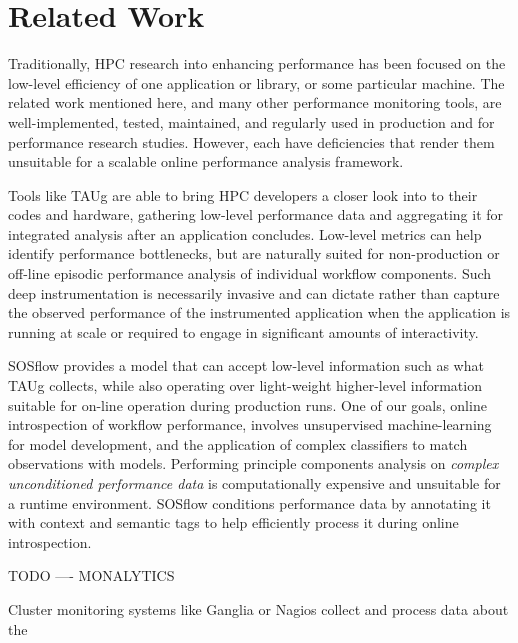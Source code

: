 
\section{Related Work}
%
Traditionally, HPC research into enhancing performance has been
focused on the low-level efficiency of one application or library, or
some particular machine.
%
The related work mentioned here, and many other performance monitoring
tools, are well-implemented, tested, maintained, and regularly used
in production and for performance research studies.
%
However, each have deficiencies that render them unsuitable for a scalable
online performance analysis framework.
%
\par
%
Tools like TAUg \cite{huck2006taug} are able to bring HPC developers a closer look into to
their codes and hardware, gathering low-level performance data and
aggregating it for integrated analysis after an application concludes.
%
Low-level metrics can help identify performance bottlenecks, but are
naturally suited for non-production or off-line episodic performance
analysis of individual workflow components.
%
Such deep instrumentation is necessarily invasive and can dictate
rather than capture the observed performance of the instrumented
application when the application is running at scale or required to
engage in significant amounts of interactivity.
%
\par
%
SOSflow provides a model that can accept low-level information such as
what TAUg collects, while also operating over light-weight higher-level
information suitable for on-line operation during production runs.
%
One of our goals, online introspection of workflow performance,
involves unsupervised machine-learning for model development, and the
application of complex classifiers to match observations with models.
%
Performing principle components analysis on \textit{complex unconditioned
  performance data} is computationally expensive and unsuitable for a
runtime environment.
%
SOSflow conditions performance data by annotating it with context and
semantic tags to help efficiently process it during online
introspection.
%
\par
%
TODO ---- MONALYTICS
%
\par
%
Cluster monitoring systems like Ganglia \cite{massie2004ganglia} or
Nagios \cite{katsaros2011building} collect and process data about the
